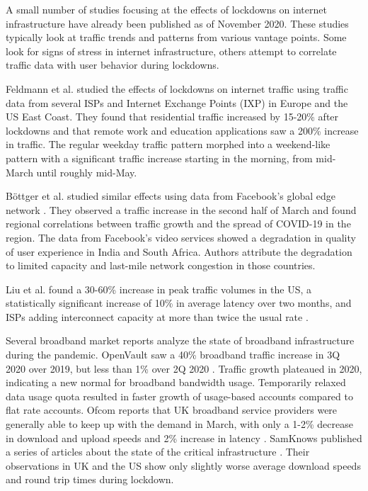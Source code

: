 \documentclass[conference,10pt]{IEEEtran}
\begin{document}

A small number of studies focusing at the effects of lockdowns on internet infrastructure have already been published as of November 2020. These studies typically look at traffic trends and patterns from various vantage points. Some look for signs of stress in internet infrastructure, others attempt to correlate traffic data with user behavior during lockdowns.

Feldmann et al. studied the effects of lockdowns on internet traffic using traffic data from several ISPs and Internet Exchange Points (IXP) in Europe and the US East Coast\cite{feldmann2020lockdown}. They found that residential traffic increased by 15-20\% after lockdowns and that remote work and education applications saw a 200\% increase in traffic. The regular weekday traffic pattern morphed into a weekend-like pattern with a significant traffic increase starting in the morning, from mid-March until roughly mid-May.

B\"{o}ttger et al. studied similar effects using data from Facebook's global edge network \cite{bottger2020internet}. They observed a traffic increase in the second half of March and found regional correlations between traffic growth and the spread of COVID-19 in the region. The data from Facebook's video services showed a degradation in quality of user experience in India and South Africa. Authors attribute the degradation to limited capacity and last-mile network congestion in those countries.

Liu et al. found a 30-60\% increase in peak traffic volumes in the US, a statistically significant increase of 10\% in average latency over two months, and ISPs adding interconnect capacity at more than twice the usual rate \cite{liu2020characterizing}.

Several broadband market reports analyze the state of broadband infrastructure during the pandemic. OpenVault saw a 40\% broadband traffic increase in 3Q 2020 over 2019, but less than 1\% over 2Q 2020 \cite{openvault}. Traffic growth plateaued in 2020, indicating a new normal for broadband bandwidth usage. Temporarily relaxed data usage quota resulted in faster growth of usage-based accounts compared to flat rate accounts. Ofcom reports that UK broadband service providers were generally able to keep up with the demand in March, with only a 1-2\% decrease in download and upload speeds and 2\% increase in latency \cite{uk-home-broadband-performance}. SamKnows published a series of articles about the state of the critical infrastructure \cite{samknows-cdn,samknows-video-streaming,samknows-video-conferencing,samknows-usa}. Their observations in UK and the US show only slightly worse average download speeds and round trip times during lockdown.
\end{document}
